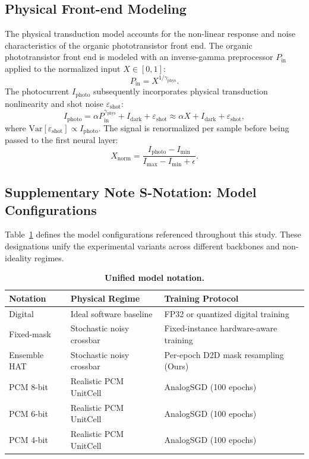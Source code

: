 \subsection{Physical Front-end Modeling}
\label{subsec:supp-frontend-math}

The physical transduction model accounts for the non-linear response and noise characteristics of the organic phototransistor front end. The organic phototransistor front end is modeled with an inverse-gamma preprocessor $P_{\mathrm{in}}$ applied to the normalized input $X \in [0,1]$:
\begin{equation}
    P_{\mathrm{in}} = X^{1/\gamma_{\mathrm{phys}}}.
\label{eq:inverse-gamma}
\end{equation}
The photocurrent $I_{\mathrm{photo}}$ subsequently incorporates physical transduction nonlinearity and shot noise $\varepsilon_{\mathrm{shot}}$:
\begin{equation}
    I_{\mathrm{photo}} = \alpha P_{\mathrm{in}}^{\gamma_{\mathrm{phys}}} + I_{\mathrm{dark}} + \varepsilon_{\mathrm{shot}} \approx \alpha X + I_{\mathrm{dark}} + \varepsilon_{\mathrm{shot}},
\label{eq:frontend-photoresponse}
\end{equation}
where $\mathrm{Var}[\varepsilon_{\mathrm{shot}}] \propto I_{\mathrm{photo}}$. The signal is renormalized per sample before being passed to the first neural layer:
\begin{equation}
    X_{\mathrm{norm}} = \frac{I_{\mathrm{photo}}-I_{\min}}{I_{\max}-I_{\min}+\epsilon}.
\label{eq:frontend-renorm}
\end{equation}


\subsection{Supplementary Note S-Notation: Model Configurations}
\label{note:supp-notation}

Table~\ref{tab:supp-notation} defines the model configurations referenced throughout this study. These designations unify the experimental variants across different backbones and non-ideality regimes.

\begin{table}[htbp]
\centering
\caption{\textbf{Unified model notation.}}
\label{tab:supp-notation}
\begin{tabular}{lll}
\toprule
\textbf{Notation} & \textbf{Physical Regime} & \textbf{Training Protocol} \\
\midrule
Digital & Ideal software baseline & FP32 or quantized digital training \\
Fixed-mask & Stochastic noisy crossbar & Fixed-instance hardware-aware training \\
Ensemble HAT & Stochastic noisy crossbar & Per-epoch D2D mask resampling (Ours) \\
PCM 8-bit & Realistic PCM UnitCell & AnalogSGD (100 epochs) \\
PCM 6-bit & Realistic PCM UnitCell & AnalogSGD (100 epochs) \\
PCM 4-bit & Realistic PCM UnitCell & AnalogSGD (100 epochs) \\
\bottomrule
\end{tabular}
\end{table}

